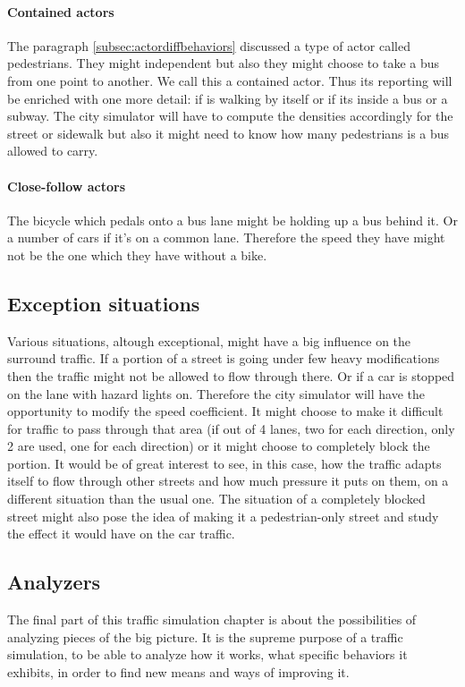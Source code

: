 \documentclass[a4paper,12pt,twoside]{book}
\begin{document}
\paragraph{Contained actors}
The paragraph \ref{subsec:actordiffbehaviors} discussed a type of actor called pedestrians. They might independent but also they might choose to take a bus from one point to another. We call this a contained actor. Thus its reporting will be enriched with one more detail: if is walking by itself or if its inside a bus or a subway. The city simulator will have to compute the densities accordingly for the street or sidewalk but also it might need to know how many pedestrians is a bus allowed to carry.

\paragraph{Close-follow actors}
The bicycle which pedals onto a bus lane might be holding up a bus behind it. Or a number of cars if it's on a common lane. Therefore the speed they have might not be the one which they have without a bike.

\subsection{Exception situations}
Various situations, altough exceptional, might have a big influence on the surround traffic. If a portion of a street is going under few heavy modifications then the traffic might not be allowed to flow through there. Or if a car is stopped on the lane with hazard lights on. Therefore the city simulator will have the opportunity to modify the speed coefficient. It might choose to make it difficult for traffic to pass through that area (if out of 4 lanes, two for each direction, only 2 are used, one for each direction) or it might choose to completely block the portion. It would be of great interest to see, in this case, how the traffic adapts itself to flow through other streets and how much pressure it puts on them, on a different situation than the usual one. The situation of a completely blocked street might also pose the idea of making it a pedestrian-only street and study the effect it would have on the car traffic.

\subsection{Analyzers}

The final part of this traffic simulation chapter is about the possibilities of analyzing pieces of the big picture. It is the supreme purpose of a traffic simulation, to be able to analyze how it works, what specific behaviors it exhibits, in order to find new means and ways of improving it.
\end{document}
